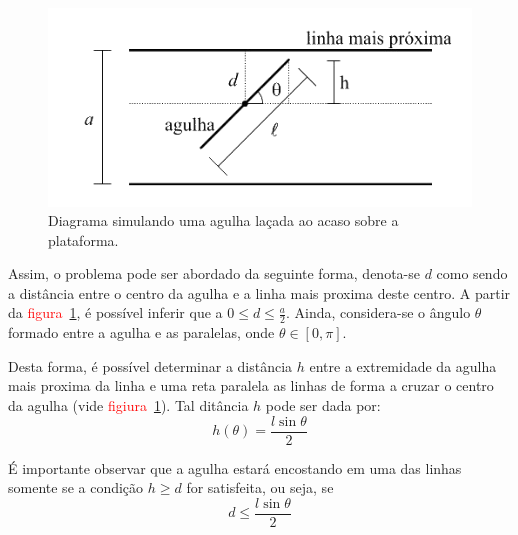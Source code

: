 \documentclass [a4paper,10pt]{article}
\newcommand{\e}[1]{\textcolor{red}{#1}}
\begin{document}
    \begin{figure}[!ht]
      \centering
      \includegraphics[scale=0.5]{Esquema.png}
      \caption{Diagrama simulando uma agulha laçada ao acaso sobre a plataforma.\label{fig:esquema}}
    \end{figure}
    \newpage
    
    \pagestyle{fancy}
    \fancyhf{}
    \renewcommand{\footrulewidth}{0.0pt}
    \renewcommand{\headrulewidth}{0.1pt}
    \cfoot{\bfseries \thepage}

    Assim, o problema pode ser abordado da seguinte forma, denota-se $d$ como sendo a distância entre o centro da agulha
    e a linha mais proxima deste centro. A partir da \e{figura}~\ref{fig:esquema}, é possível inferir que a
    $0 \le d \le \frac{a}{2}$.
    Ainda, considera-se o ângulo $\theta$ formado entre a agulha e as paralelas, onde
    $\theta \in [0, \pi]$.

    Desta forma, é possível determinar a distância $h$ entre a extremidade da agulha mais proxima da linha e
    uma reta paralela as linhas de forma a cruzar o centro da agulha (vide \e{figiura}~\ref{fig:esquema}).
    Tal ditância $h$ pode ser dada por:
    \begin{equation}\label{eq:h}
      h(\theta) = \frac{l\sin\theta}{2}
    \end{equation}
    
    É importante observar que a agulha estará encostando em uma das linhas somente se a condição
    $h \ge d$ for satisfeita, ou seja, se
    \begin{equation}\label{eq:desiD}
      d \le \frac{l\sin\theta}{2}
    \end{equation}
    
\end{document}
